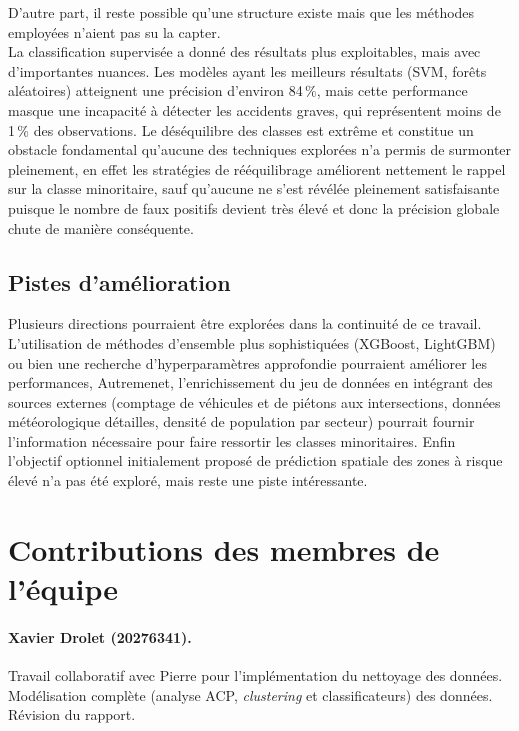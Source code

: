 \documentclass[11pt]{article}
\begin{document}
D'autre part, il reste possible qu'une structure existe mais que les méthodes employées n'aient pas su la capter.\\

La classification supervisée a donné des résultats plus exploitables, mais avec d'importantes nuances. Les modèles ayant les meilleurs résultats (SVM, forêts aléatoires) atteignent une précision d'environ 84\,\%, mais cette performance masque une incapacité à détecter les accidents graves, qui représentent moins de 1\,\% des observations. Le déséquilibre des classes est extrême et constitue un obstacle fondamental qu'aucune des techniques explorées n'a permis de surmonter pleinement, en effet les stratégies de rééquilibrage améliorent nettement le rappel sur la classe minoritaire, sauf qu'aucune ne s'est révélée pleinement satisfaisante puisque le nombre de faux positifs devient très élevé et donc la précision globale chute de manière conséquente.

\subsection{Pistes d'amélioration}

Plusieurs directions pourraient être explorées dans la continuité de ce travail. L'utilisation de méthodes d'ensemble plus sophistiquées (XGBoost, LightGBM) ou bien une recherche d'hyperparamètres approfondie pourraient améliorer les performances, Autremenet, l'enrichissement du jeu de données en intégrant des sources externes (comptage de véhicules et de piétons aux intersections, données météorologique détailles, densité de population par secteur) pourrait fournir l'information nécessaire pour faire ressortir les classes minoritaires.
Enfin l'objectif optionnel initialement proposé de prédiction spatiale des zones à risque élevé n'a pas été exploré, mais reste une piste intéressante. 
 
\section{Contributions des membres de l'équipe}
 
\paragraph{Xavier Drolet (20276341).}

Travail collaboratif avec Pierre pour l’implémentation du nettoyage des données. Modélisation complète (analyse ACP, \textit{clustering} et classificateurs) des données. Révision du rapport.
 
\end{document}

